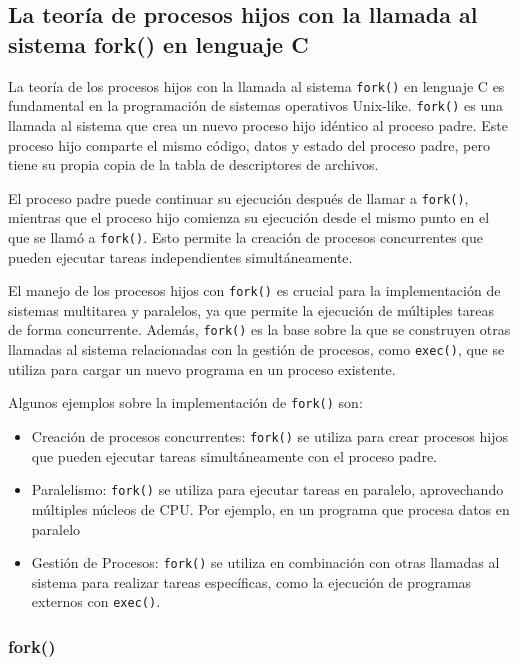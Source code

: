 \subsection{La teoría de procesos hijos con la llamada al sistema fork() en lenguaje C}

La teoría de los procesos hijos con la llamada al sistema \texttt{fork()} en lenguaje C es fundamental en la programación de sistemas operativos Unix-like. \texttt{fork()} es una llamada al sistema que crea un nuevo proceso hijo idéntico al proceso padre. Este proceso hijo comparte el mismo código, datos y estado del proceso padre, pero tiene su propia copia de la tabla de descriptores de archivos.

El proceso padre puede continuar su ejecución después de llamar a \texttt{fork()}, mientras que el proceso hijo comienza su ejecución desde el mismo punto en el que se llamó a \texttt{fork()}. Esto permite la creación de procesos concurrentes que pueden ejecutar tareas independientes simultáneamente.

El manejo de los procesos hijos con \texttt{fork()} es crucial para la implementación de sistemas multitarea y paralelos, ya que permite la ejecución de múltiples tareas de forma concurrente. Además, \texttt{fork()} es la base sobre la que se construyen otras llamadas al sistema relacionadas con la gestión de procesos, como \texttt{exec()}, que se utiliza para cargar un nuevo programa en un proceso existente.

Algunos ejemplos sobre la implementación de \texttt{fork()} son:

\begin{itemize}
	\item   Creación de procesos concurrentes: \texttt{fork()} se utiliza para crear procesos hijos que pueden ejecutar tareas simultáneamente con el   proceso padre.
	\item   Paralelismo: \texttt{fork()} se utiliza para ejecutar tareas en paralelo,   aprovechando múltiples núcleos de CPU. Por ejemplo, en un programa que   procesa datos en paralelo
	\item   Gestión de Procesos: \texttt{fork()} se utiliza en combinación con otras   llamadas al sistema para realizar tareas específicas, como la   ejecución de programas externos con \texttt{exec()}.
\end{itemize}

\subsubsection{fork()}

